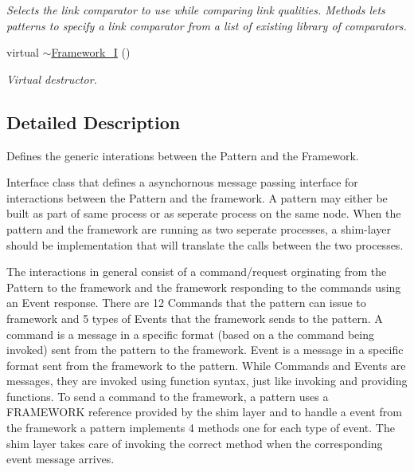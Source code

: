 \begin{DoxyCompactItemize}
\begin{DoxyCompactList}\small\item\em Selects the link comparator to use while comparing link qualities. Methods lets patterns to specify a link comparator from a list of existing library of comparators. \end{DoxyCompactList}\item 
virtual \hyperlink{class_p_w_i_1_1_framework___i_ab16270cb3574bf7a2ef9a63144d9a2f2}{$\sim$\+Framework\+\_\+I} ()\hypertarget{class_p_w_i_1_1_framework___i_ab16270cb3574bf7a2ef9a63144d9a2f2}{}\label{class_p_w_i_1_1_framework___i_ab16270cb3574bf7a2ef9a63144d9a2f2}

\begin{DoxyCompactList}\small\item\em Virtual destructor. \end{DoxyCompactList}\end{DoxyCompactItemize}


\subsection{Detailed Description}
Defines the generic interations between the Pattern and the Framework. 

Interface class that defines a asynchornous message passing interface for interactions between the Pattern and the framework. A pattern may either be built as part of same process or as seperate process on the same node. When the pattern and the framework are running as two seperate processes, a shim-\/layer should be implementation that will translate the calls between the two processes.

The interactions in general consist of a command/request orginating from the Pattern to the framework and the framework responding to the commands using an Event response. There are 12 Commands that the pattern can issue to framework and 5 types of Events that the framework sends to the pattern. A command is a message in a specific format (based on a the command being invoked) sent from the pattern to the framework. Event is a message in a specific format sent from the framework to the pattern. While Commands and Events are messages, they are invoked using function syntax, just like invoking and providing functions. To send a command to the framework, a pattern uses a F\+R\+A\+M\+E\+W\+O\+RK reference provided by the shim layer and to handle a event from the framework a pattern implements 4 methods one for each type of event. The shim layer takes care of invoking the correct method when the corresponding event message arrives.

